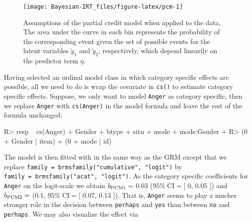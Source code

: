 \documentclass[jss]{jss}
\begin{document}
\begin{CodeChunk}
\begin{figure}

{\centering \texttt{[image: Bayesian-IRT\_files/figure-latex/pcm-1]} 

}

\caption{Assumptions of the partial credit model when applied to the  data. The area under the curve in each bin represents the probability of the corresponding event given the set of possible events for the latent variables $\tilde{y}_1$ and $\tilde{y}_2$, respectively, which depend linearily on the predictor term $\eta$.}\label{fig:pcm}
\end{figure}
\end{CodeChunk}

Having selected an ordinal model class in which category specific
effects are possible, all we need to do is wrap the covariate in
\texttt{cs()} to estimate category specific effects. Suppose, we only
want to model \texttt{Anger} as category specific, then we replace
\texttt{Anger} with \texttt{cs(Anger)} in the model formula and leave
the rest of the formula unchanged:

\begin{CodeChunk}

\begin{CodeInput}
R> resp ~ cs(Anger) + Gender + btype + situ + mode + mode:Gender +
R>   (0 + Gender | item) + (0 + mode | id)
\end{CodeInput}
\end{CodeChunk}

The model is then fitted with  in the same way as the GRM
except that we replace
\texttt{family\ =\ brmsfamily("cumulative",\ "logit")} by
\texttt{family\ =\ brmsfamily("acat",\ "logit")}. As the category
specific coefficients for \texttt{Anger} on the logit-scale we obtain
\(b_{\rm PCM 1} =\) 0.03 (\(95\% \; \text{CI} = [\) 0, 0.05 \(]\)) and
\(b_{\rm PCM 2} =\) (0.1, \(95\% \; \text{CI} = [\) 0.07, 0.13 \(]\)).
That is, \texttt{Anger} seems to play a mucher stronger role in the
decision between \texttt{perhaps} and \texttt{yes} than between
\texttt{no} and \texttt{perhaps}. We may also visualize the effect via
\end{document}
